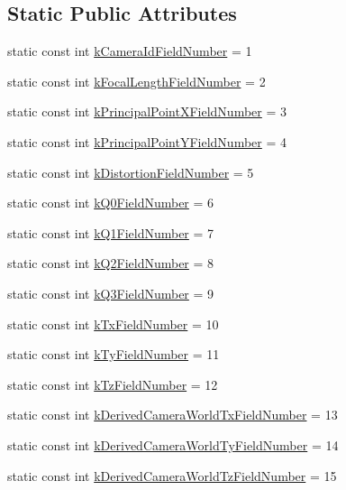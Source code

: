 \subsection*{Static Public Attributes}
\begin{DoxyCompactItemize}
\item 
static const int \hyperlink{class_s_s_l___geometry_camera_calibration_a6cb584c10b60e4ec2309ff1648e77ca1}{k\-Camera\-Id\-Field\-Number} = 1
\item 
static const int \hyperlink{class_s_s_l___geometry_camera_calibration_a51c48bb8970f98a50dc25e878276de60}{k\-Focal\-Length\-Field\-Number} = 2
\item 
static const int \hyperlink{class_s_s_l___geometry_camera_calibration_aa99102ae1154c1a500071ad462014655}{k\-Principal\-Point\-X\-Field\-Number} = 3
\item 
static const int \hyperlink{class_s_s_l___geometry_camera_calibration_acc20dd70c59dd6b9f32e04ee6e59652b}{k\-Principal\-Point\-Y\-Field\-Number} = 4
\item 
static const int \hyperlink{class_s_s_l___geometry_camera_calibration_ad1867e0a941d4d640b91d3335dd3b31a}{k\-Distortion\-Field\-Number} = 5
\item 
static const int \hyperlink{class_s_s_l___geometry_camera_calibration_a458e204afece358321c8f1e27b4c39b9}{k\-Q0\-Field\-Number} = 6
\item 
static const int \hyperlink{class_s_s_l___geometry_camera_calibration_a24fd928b1f5cde66233f7e0b55c4d1b2}{k\-Q1\-Field\-Number} = 7
\item 
static const int \hyperlink{class_s_s_l___geometry_camera_calibration_a326f44647c5f78700bf7d3290f3c83b9}{k\-Q2\-Field\-Number} = 8
\item 
static const int \hyperlink{class_s_s_l___geometry_camera_calibration_a844b6680c38785fb95d314614bd0c1a2}{k\-Q3\-Field\-Number} = 9
\item 
static const int \hyperlink{class_s_s_l___geometry_camera_calibration_a8a448b22432ac5221f00726f4deb1be7}{k\-Tx\-Field\-Number} = 10
\item 
static const int \hyperlink{class_s_s_l___geometry_camera_calibration_a402d20a908828f10b589face5b9978de}{k\-Ty\-Field\-Number} = 11
\item 
static const int \hyperlink{class_s_s_l___geometry_camera_calibration_aff281cefbb148fd5cf845b4cf67ba5e1}{k\-Tz\-Field\-Number} = 12
\item 
static const int \hyperlink{class_s_s_l___geometry_camera_calibration_a79eed6e44e6181f9eca60c17f5319b1d}{k\-Derived\-Camera\-World\-Tx\-Field\-Number} = 13
\item 
static const int \hyperlink{class_s_s_l___geometry_camera_calibration_a5f390f28756dd9a2c9a38c661b4ecb03}{k\-Derived\-Camera\-World\-Ty\-Field\-Number} = 14
\item 
static const int \hyperlink{class_s_s_l___geometry_camera_calibration_a79ef0ee6efcfe5a45142f73eabea2095}{k\-Derived\-Camera\-World\-Tz\-Field\-Number} = 15
\end{DoxyCompactItemize}
